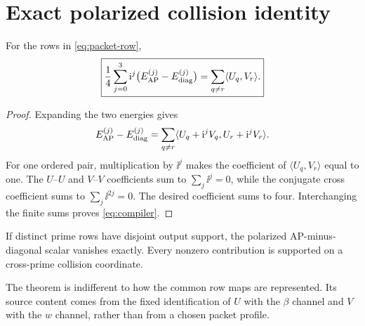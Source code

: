 \section{Exact polarized collision identity}

\begin{theorem}
\label{thm:compiler}
For the rows in \eqref{eq:packet-row},
\begin{equation}
 \boxed{
 \frac14\sum_{j=0}^3\mathrm i^j
 \bigl(E_{\rm AP}^{(j)}-E_{\rm diag}^{(j)}\bigr)
 =\sum_{q\ne r}\langle U_q,V_r\rangle.}
 \label{eq:compiler}
\end{equation}
\end{theorem}

\begin{proof}
Expanding the two energies gives
\[
 E_{\rm AP}^{(j)}-E_{\rm diag}^{(j)}
 =\sum_{q\ne r}
 \langle U_q+\mathrm i^jV_q,U_r+\mathrm i^jV_r\rangle.
\]
For one ordered pair, multiplication by $\ii^j$ makes the coefficient of
$\langle U_q,V_r\rangle$ equal to one.  The $U$--$U$ and $V$--$V$ coefficients sum
to $\sum_j\ii^j=0$, while the conjugate cross coefficient sums to
$\sum_j\ii^{2j}=0$.  The desired coefficient sums to four.  Interchanging the finite
sums proves \eqref{eq:compiler}.
\end{proof}

\begin{corollary}
If distinct prime rows have disjoint output support, the polarized AP-minus-diagonal
scalar vanishes exactly.  Every nonzero contribution is supported on a cross-prime
collision coordinate.
\end{corollary}

The theorem is indifferent to how the common row maps are represented.  Its source
content comes from the fixed identification of $U$ with the $\beta$ channel and $V$
with the $w$ channel, rather than from a chosen packet profile.
